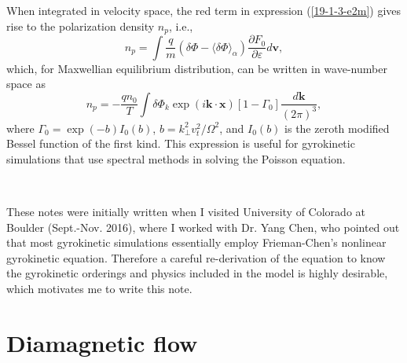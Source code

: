 \documentclass{article}
\begin{document}
When integrated in velocity space, the red term in expression
(\ref{19-1-3-e2m}) gives rise to the polarization density $n_p$, i.e.,
\begin{equation}
  n_p = \int \frac{q}{m} (\delta \Phi - \langle \delta \Phi \rangle_{\alpha})
  \frac{\partial F_0}{\partial \varepsilon} d\mathbf{v},
\end{equation}
which, for Maxwellian equilibrium distribution, can be written in wave-number
space as
\begin{equation}
  n_p = - \frac{q n_0}{T} \int \delta \Phi_k \exp (i\mathbf{k} \cdot
  \mathbf{x}) [1 - \Gamma_0] \frac{d\mathbf{k}}{(2 \pi)^3},
\end{equation}
where $\Gamma_0 = \exp (- b) I_0 (b)$, $b = k_{\perp}^2 v_t^2 / \Omega^2$, and
$I_0 (b)$ is the zeroth modified Bessel function of the first kind. This
expression is useful for gyrokinetic simulations that use spectral methods in
solving the Poisson equation.

\

These notes were initially written when I visited University of Colorado at
Boulder (Sept.-Nov. 2016), where I worked with Dr. Yang Chen, who pointed out
that most gyrokinetic simulations essentially employ Frieman-Chen's nonlinear
gyrokinetic equation. Therefore a careful re-derivation of the equation to
know the gyrokinetic orderings and physics included in the model is highly
desirable, which motivates me to write this note.

\appendix\section{Diamagnetic flow}\label{17-9-26-1}\label{17-8-19-e1}
\end{document}
